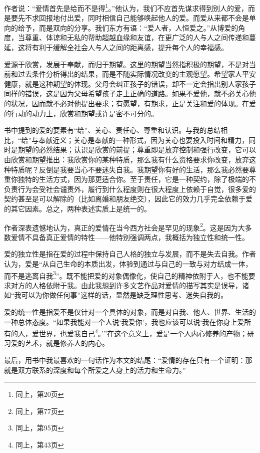 \par 作者说：“爱情首先是给而不是得\footnote{同上，第20页}。”他认为，我们不应首先谋求得到别人的爱，而是要先不求回报地付出爱，同时相信自己能够唤起他人的爱。而爱从来都不会是单向的给予，而是双向的分享。我们东方有语：“爱人者，人恒爱之。”从博爱的角度，当尊重、体谅和无私的帮助超越血缘和友谊，在更广泛的人与人之间传递和蔓延，这将有利于缓解全社会人与人之间的距离感，提升每个人的幸福感。
\par 爱源于欣赏，发展于奉献，而归于期望。这里的期望当然指积极的期望，不是对当前和过去条件分析得出的结果，而是不随实际情况改变的主观愿望。希望家人平安健康，就是这种期望的体现。父母会纠正孩子的错误，却不一定会指出别人家孩子同样的错误，这是因为父母希望孩子走上正确的道路。如果不爱他，就不必关心他的状况，因而就不必对他提出要求；有愿望，有期求，正是关注和爱的体现。在爱的行动的动力上，欣赏和期望或许是密不可分的。
\par 书中提到的爱的要素有“给”、关心、责任心、尊重和认识。与我的总结相比，“给”与奉献近义；关心是奉献的一种形式，因为关心也要投入时间和精力，同时是期望的必然结果；认识是欣赏的前提；尊重即是放弃控制和强行改变，它可以由欣赏和期望推出：我欣赏你的某种特质，那么我有什么资格要求你改变，放弃这种特质呢？反倒是我要当心不要迷失自我。我期望你有好的生活，那么我必然要尊重你独特的生活方式，因为那更适合你。至于责任，它是一种契约，除了极端的不负责行为会受社会谴责外，履行到什么程度则在很大程度上依赖于自觉，很多爱的契约甚至是可以解除的（比如离婚和朋友绝交），因此它的效力几乎完全依赖于爱的其它因素。总之，两种表述实质上是统一的。
\par 作者深表遗憾地认为，真正的爱情在当今西方社会是罕见的现象\footnote{同上，第77页}。这是因为大多数爱情不具备真正爱情的特性——他特别强调两点，我概括为独立性和统一性。
\par 爱的独立性是指在爱的过程中保持自己人格的独立与发展，而不是失去自我。作者认为，爱是“从自己生命的本质出发，体验到通过与自己的一致与对方结成一体，而不是逃离自我\footnote{同上，第95页}”。既不能把爱的对象偶像化，使自己的精神依附于人，也不能要求对方的人格依附于我。由此我想到许多文艺作品对爱情的描写其实是误导，诸如“我可以为你做任何事”这样的话，显然是缺乏理性思考、迷失自我的。
\par 爱的统一性是指爱不是仅针对一个具体的对象，而是对自我、他人、世界、生活的一种总体态度。“如果我能对一个人说‘我爱你’，我也应该可以说‘我在你身上爱所有的人，爱世界，也爱我自己\footnote{同上，第43页}。’”在这个意义上，爱是一个人内心修养的产物；研习爱的艺术，就是修养人的内心。
\par 最后，用书中我最喜欢的一句话作为本文的结尾：“爱情的存在只有一个证明：那就是双方联系的深度和每个所爱之人身上的活力和生命力。”
\par {}

